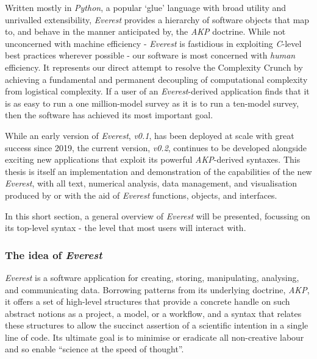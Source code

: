 \documentclass[a4paper,11pt,oneside]{book}
\begin{document}
Written mostly in \textit{Python}, a popular `glue' language with broad utility and unrivalled extensibility, \textit{Everest} provides a hierarchy of software objects that map to, and behave in the manner anticipated by, the \textit{AKP} doctrine. While not unconcerned with machine efficiency - \textit{Everest} is fastidious in exploiting \textit{C}-level best practices wherever possible - our software is most concerned with \textit{human} efficiency. It represents our direct attempt to resolve the Complexity Crunch by achieving a fundamental and permanent decoupling of computational complexity from logistical complexity. If a user of an \textit{Everest}-derived application finds that it is as easy to run a one million-model survey as it is to run a ten-model survey, then the software has achieved its most important goal.

While an early version of \textit{Everest}, \textit{v0.1}, has been deployed at scale with great success since 2019, the current version, \textit{v0.2}, continues to be developed alongside exciting new applications that exploit its powerful \textit{AKP}-derived syntaxes. This thesis is itself an implementation and demonstration of the capabilities of the new \textit{Everest}, with all text, numerical analysis, data management, and visualisation produced by or with the aid of \textit{Everest} functions, objects, and interfaces.

In this short section, a general overview of \textit{Everest} will be presented, focussing on its top-level syntax - the level that most users will interact with.

\subsubsection{The idea of \textit{Everest}}

\textit{Everest} is a software application for creating, storing, manipulating, analysing, and communicating data. Borrowing patterns from its underlying doctrine, \textit{AKP}, it offers a set of high-level structures that provide a concrete handle on such abstract notions as a project, a model, or a workflow, and a syntax that relates these structures to allow the succinct assertion of a scientific intention in a single line of code. Its ultimate goal is to minimise or eradicate all non-creative labour and so enable ``science at the speed of thought''.
\end{document}

